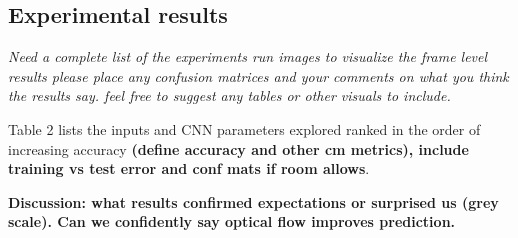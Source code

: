 \documentclass{article}
\begin{document}
\subsection{Experimental results} %
\label{sub:experimental_results}
\textit{Need a complete list of the experiments run
images to visualize the frame level results
please place any confusion matrices and your comments on what you think the results say.
feel free to suggest any tables or other visuals to include.}

Table 2 lists the inputs and CNN parameters explored ranked in the order of increasing accuracy \textbf{(define accuracy and other cm metrics), include training vs test error and conf mats if room allows}.  

 \textbf{Discussion: what results confirmed expectations or surprised us (grey scale). Can we confidently say optical flow improves prediction. }
\end{document}
